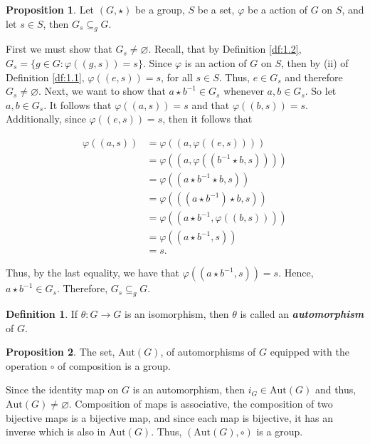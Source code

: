 \documentclass{article}
\makeatletter
\theoremstyle{definition}
\newtheorem{prop}{Proposition}[section]
\newtheorem{definition}{Definition}[section]
\theoremstyle{remark}
\let\oldproofname=\proofname
\renewcommand{\proofname}{\bf{\textit{\oldproofname}}}
\theoremstyle{definition}
\renewenvironment{proof}[1][\proofname]{\par
  \pushQED{\qed}%
  \normalfont \topsep6\p@\@plus6\p@\relax
  \list{}{\leftmargin=0mm
          \rightmargin=0mm
          \settowidth{\itemindent}{\itshape#1}%
          \labelwidth=4mm
          \parsep=0pt \listparindent=0mm%
  }
  \item[\hskip\labelsep
        \itshape
    #1\@addpunct{.}]\ignorespaces
}{%
  \popQED\endlist\@endpefalse
}
\makeatother
\begin{document}
    \begin{prop}\label{prop:1.6}
        Let $(G,\star)$ be a group, $S$ be a set, $\varphi$ be a action of $G$ on $S$, and let $s\in S$, then $G_s\subseteq_g G$.
    \end{prop}
        \begin{proof}
            First we must show that $G_s\neq\varnothing$. Recall, that by Definition \ref{df:1.2}, $G_s=\{g\in G\colon\varphi((g,s))=s\}$. Since $\varphi$ is an action of $G$ on $S$, then by (ii) of Definition \ref{df:1.1}, $\varphi((e,s))=s$, for all $s\in S$. Thus, $e\in G_s$ and therefore $G_s\neq\varnothing$. Next, we want to show that $a\star b^{-1}\in G_s$ whenever $a,b\in G_s$. So let $a,b\in G_s$. It follows that $\varphi((a,s))=s$ and that $\varphi((b,s))=s$. Additionally, since $\varphi((e,s))=s$, then it follows that
            
            \begin{equation*}
                \begin{split}
                    \varphi((a,s)) &= \varphi((a,\varphi((e,s)))) \\
                    &= \varphi((a,\varphi((b^{-1}\star b,s)))) \\
                    &= \varphi((a\star b^{-1}\star b,s)) \\ 
                    &= \varphi(((a\star b^{-1})\star b,s)) \\
                    &= \varphi((a\star b^{-1},\varphi((b,s)))) \\
                    &= \varphi((a\star b^{-1},s)) \\
                    &= s.
                \end{split}
            \end{equation*}
            
            Thus, by the last equality, we have that $\varphi((a\star b^{-1},s))=s$. Hence, $a\star b^{-1}\in G_s$. Therefore, $G_s\subseteq_g G$.
        \end{proof}
        
    \newpage
        
    \begin{definition}\label{df:1.5}
        If $\theta\colon G\rightarrow G$ is an isomorphism, then $\theta$ is called an \textbf{\textit{automorphism}} of $G$. 
    \end{definition}
    
    \begin{prop}\label{prop:1.7}
        The set, $\text{Aut}(G)$, of automorphisms of $G$ equipped with the operation $\circ$ of composition is a group.  
    \end{prop}
        \begin{proof}
            Since the identity map on $G$ is an automorphism, then $i_G\in\text{Aut}(G)$ and thus, $\text{Aut}(G)\neq\varnothing$. Composition of maps is associative, the composition of two bijective maps is a bijective map, and since each map is bijective, it has an inverse which is also in $\text{Aut}(G)$. Thus, $(\text{Aut}(G),\circ)$ is a group.
        \end{proof}
        
\end{document}
